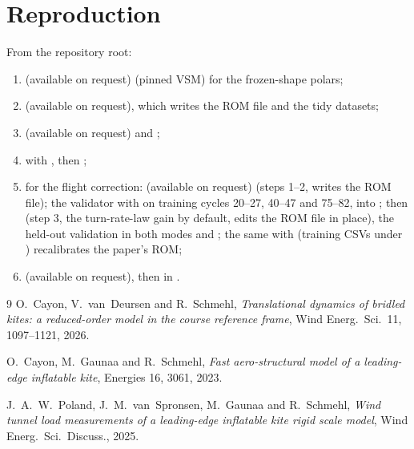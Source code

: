 \documentclass[11pt,a4paper]{article}
\begin{document}
\section{Reproduction}
From the repository root:
\begin{enumerate}
  \item {} (available on request)
        (pinned VSM) for the frozen-shape polars;
  \item {} (available on request), which
        writes the ROM file and the tidy datasets;
  \item {} (available on request) and
        ;
  \item {}
        with , then
        ;
  \item for the flight correction:
         (available on request)
        (steps 1--2, writes the ROM file); the validator with
        on training cycles 20--27, 40--47 and 75--82, into
        ;
        then  (step 3, the
        turn-rate-law gain by default, edits the ROM file in place), the
        held-out validation in both modes and
        ; the same with
         (training CSVs under
        ) recalibrates the paper's ROM;
  \item {} (available on request), then
         in .
\end{enumerate}

\begin{thebibliography}{9}
O.~Cayon, V.~van~Deursen and R.~Schmehl,
\emph{Translational dynamics of bridled kites: a reduced-order model in the
course reference frame}, Wind Energ.\ Sci.\ 11, 1097--1121, 2026.

O.~Cayon, M.~Gaunaa and R.~Schmehl,
\emph{Fast aero-structural model of a leading-edge inflatable kite},
Energies 16, 3061, 2023.

J.~A.~W.~Poland, J.~M.~van~Spronsen, M.~Gaunaa and R.~Schmehl,
\emph{Wind tunnel load measurements of a leading-edge inflatable kite rigid
scale model}, Wind Energ.\ Sci.\ Discuss., 2025.
\end{thebibliography}
\end{document}
